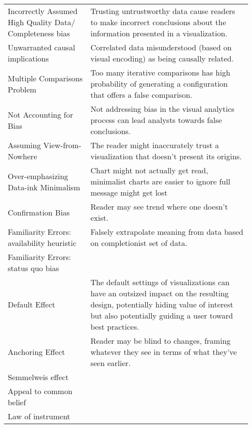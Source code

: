\begin{longtable}{p{5cm}p{12cm}}
   \rowcolor{colord}Incorrectly Assumed High Quality Data/ Completeness bias & Trusting untrustworthy data cause readers to make incorrect conclusions about the information presented in a visualization. \cite{mayrTrust2019, sacha2015role}\\
 \rowcolor{colord-opaque}Unwarranted causal implications & Correlated data misunderstood (based on visual encoding) as being causally related. \cite{xiong2019illusion, few2019loom}\\
 \rowcolor{colord}Multiple Comparisons Problem & Too many iterative comparisons has high probability of generating a configuration that offers a false comparison. \cite{pu2018garden, zgraggen2018investigating}\\
 \rowcolor{colord-opaque}Not Accounting for Bias & Not addressing bias in the visual analytics process can lead analysts towards false conclusions. \cite{wall2017warning}\\
 \rowcolor{colord}Assuming View-from-Nowhere & The reader might inaccurately trust a visualization that doesn't present its origins. \cite{dignazio2019draft}\\
 \rowcolor{colord-opaque}Over-emphasizing Data-ink Minimalism & Chart might not actually get read, minimalist charts are easier to ignore full message might get lost \cite{bateman2010useful}\\
 \rowcolor{colord}Confirmation Bias & Reader may see trend where one doesn't exist. \cite{valdez2017framework, few2019loom}\\
 \rowcolor{colord-opaque}Familiarity Errors: availability heuristic & Falsely extrapolate meaning from data based on completionist set of data. \cite{few2019loom}\\
 \rowcolor{colord}Familiarity Errors: status quo bias &  \cite{few2019loom}\\
 \rowcolor{colord-opaque}Default Effect & The default settings of visualizations can have an outsized impact on the resulting design, potentially hiding value of interest but  also potentially guiding a user toward best practices. \cite{shah2006policy,few2019loom, hullman2011visualization}\\
 \rowcolor{colord}Anchoring Effect & Reader may be blind to changes, framing whatever they see in terms of what they've seen earlier. \cite{ritchie2019lie, hullman2011visualization}\\
 \rowcolor{colord-opaque}Semmelweis effect &  \cite{valdez2017framework}\\
 \rowcolor{colord}Appeal to common belief &  \cite{few2019loom}\\
 \rowcolor{colord-opaque}Law of instrument &  \cite{few2019loom}\\
\end{longtable}
\label{table:mirage-table}
